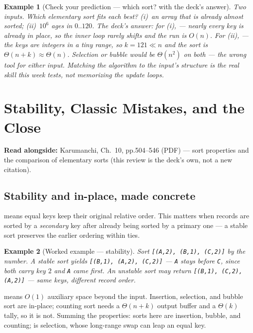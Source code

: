 \documentclass[11pt]{article}
\newtheorem{example}{Example}[section]
\begin{document}
\begin{example}[Check your prediction --- which sort? with the deck's answer]
Two inputs. Which elementary sort fits each best? (i)~an array that is already almost sorted; (ii)~$10^6$ ages in $0..120$. The deck's answer: for (i),  --- nearly every key is already in place, so the inner loop rarely shifts and the run is $O(n)$. For (ii),  --- the keys are integers in a tiny range, so $k = 121 \ll n$ and the sort is $\Theta(n + k) \approx \Theta(n)$. Selection or bubble would be $\Theta(n^2)$ on both --- the wrong tool for either input. Matching the algorithm to the input's structure is the real skill this week tests, not memorizing the update loops.
\end{example}

\section{Stability, Classic Mistakes, and the Close}

\textbf{Read alongside:} Karumanchi, Ch.~10, pp.504--546 (PDF) --- sort properties and the comparison of elementary sorts (this review is the deck's own, not a new citation).

\subsection{Stability and in-place, made concrete}

 means equal keys keep their original relative order. This matters when records are sorted by a \emph{secondary} key after already being sorted by a primary one --- a stable sort preserves the earlier ordering within ties.

\begin{example}[Worked example --- stability]
Sort \texttt{[(A,2), (B,1), (C,2)]} by the number. A stable sort yields \texttt{[(B,1), (A,2), (C,2)]} --- \texttt{A} stays before \texttt{C}, since both carry key $2$ and \texttt{A} came first. An unstable sort may return \texttt{[(B,1), (C,2), (A,2)]} --- same keys, different record order.
\end{example}

 means $O(1)$ auxiliary space beyond the input. Insertion, selection, and bubble sort are in-place; counting sort needs a $\Theta(n+k)$ output buffer and a $\Theta(k)$ tally, so it is not. Summing the properties:  sorts here are insertion, bubble, and counting;  is selection, whose long-range swap can leap an equal key.
\end{document}
